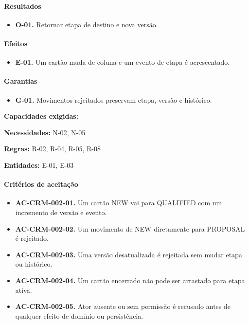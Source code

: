 \documentclass[10pt,a4paper]{article}
\begin{document}
\paragraph{Resultados}

\begin{itemize}

\item \textbf{O-01.} Retornar etapa de destino e nova versão.

\end{itemize}

\paragraph{Efeitos}

\begin{itemize}

\item \textbf{E-01.} Um cartão muda de coluna e um evento de etapa é acrescentado.

\end{itemize}

\paragraph{Garantias}

\begin{itemize}

\item \textbf{G-01.} Movimentos rejeitados preservam etapa, versão e histórico.

\end{itemize}

\textbf{Capacidades exigidas:}

\textbf{Necessidades:} N-02, N-05

\textbf{Regras:} R-02, R-04, R-05, R-08

\textbf{Entidades:} E-01, E-03

\paragraph{Critérios de aceitação}

\begin{itemize}

\item \textbf{AC-CRM-002-01.} Um cartão NEW vai para QUALIFIED com um incremento de versão e evento.

\item \textbf{AC-CRM-002-02.} Um movimento de NEW diretamente para PROPOSAL é rejeitado.

\item \textbf{AC-CRM-002-03.} Uma versão desatualizada é rejeitada sem mudar etapa ou histórico.

\item \textbf{AC-CRM-002-04.} Um cartão encerrado não pode ser arrastado para etapa ativa.

\item \textbf{AC-CRM-002-05.} Ator ausente ou sem permissão é recusado antes de qualquer efeito de domínio ou persistência.

\end{itemize}
\end{document}
